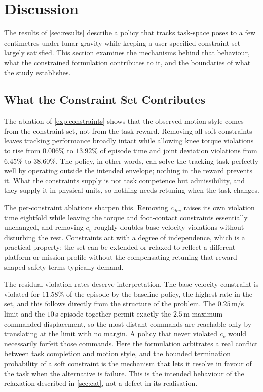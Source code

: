 \section{Discussion}
\label{sec:discussion}

The results of \cref{sec:results} describe a policy that tracks task-space poses to a few centimetres under lunar gravity while keeping a user-specified constraint set largely satisfied. This section examines the mechanisms behind that behaviour, what the constrained formulation contributes to it, and the boundaries of what the study establishes.

\subsection{What the Constraint Set Contributes}

The ablation of \cref{exp:constraints} shows that the observed motion style comes from the constraint set, not from the task reward. Removing all soft constraints leaves tracking performance broadly intact while allowing knee torque violations to rise from $0.006\%$ to $13.92\%$ of episode time and joint deviation violations from $6.45\%$ to $38.60\%$. The policy, in other words, can solve the tracking task perfectly well by operating outside the intended envelope; nothing in the reward prevents it. What the constraints supply is not task competence but admissibility, and they supply it in physical units, so nothing needs retuning when the task changes.

The per-constraint ablations sharpen this. Removing $c_{dev}$ raises its own violation time eightfold while leaving the torque and foot-contact constraints essentially unchanged, and removing $c_v$ roughly doubles base velocity violations without disturbing the rest. Constraints act with a degree of independence, which is a practical property: the set can be extended or relaxed to reflect a different platform or mission profile without the compensating retuning that reward-shaped safety terms typically demand.

The residual violation rates deserve interpretation. The base velocity constraint is violated for $11.58\%$ of the episode by the baseline policy, the highest rate in the set, and this follows directly from the structure of the problem. The $0.25\,\mathrm{m/s}$ limit and the $10\,$s episode together permit exactly the $2.5\,$m maximum commanded displacement, so the most distant commands are reachable only by translating at the limit with no margin. A policy that never violated $c_v$ would necessarily forfeit those commands. Here the formulation arbitrates a real conflict between task completion and motion style, and the bounded termination probability of a soft constraint is the mechanism that lets it resolve in favour of the task when the alternative is failure. This is the intended behaviour of the relaxation described in \cref{sec:cat}, not a defect in its realisation.

